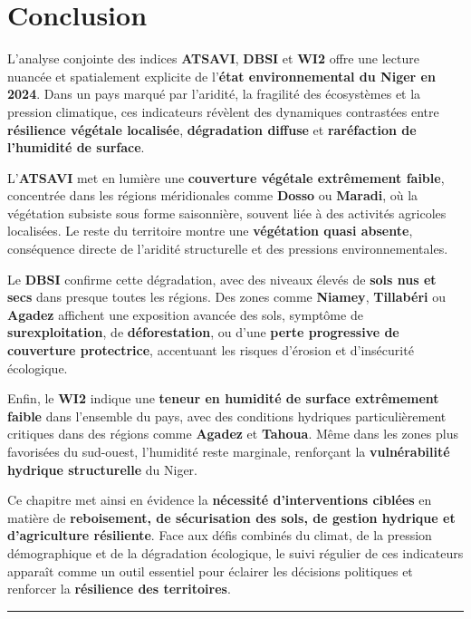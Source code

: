 \documentclass[
]{book}
\begin{document}
\section{Conclusion}\label{conclusion-3}

L'analyse conjointe des indices \textbf{ATSAVI}, \textbf{DBSI} et \textbf{WI2} offre une lecture nuancée et spatialement explicite de l'\textbf{état environnemental du Niger en 2024}. Dans un pays marqué par l'aridité, la fragilité des écosystèmes et la pression climatique, ces indicateurs révèlent des dynamiques contrastées entre \textbf{résilience végétale localisée}, \textbf{dégradation diffuse} et \textbf{raréfaction de l'humidité de surface}.

L'\textbf{ATSAVI} met en lumière une \textbf{couverture végétale extrêmement faible}, concentrée dans les régions méridionales comme \textbf{Dosso} ou \textbf{Maradi}, où la végétation subsiste sous forme saisonnière, souvent liée à des activités agricoles localisées. Le reste du territoire montre une \textbf{végétation quasi absente}, conséquence directe de l'aridité structurelle et des pressions environnementales.

Le \textbf{DBSI} confirme cette dégradation, avec des niveaux élevés de \textbf{sols nus et secs} dans presque toutes les régions. Des zones comme \textbf{Niamey}, \textbf{Tillabéri} ou \textbf{Agadez} affichent une exposition avancée des sols, symptôme de \textbf{surexploitation}, de \textbf{déforestation}, ou d'une \textbf{perte progressive de couverture protectrice}, accentuant les risques d'érosion et d'insécurité écologique.

Enfin, le \textbf{WI2} indique une \textbf{teneur en humidité de surface extrêmement faible} dans l'ensemble du pays, avec des conditions hydriques particulièrement critiques dans des régions comme \textbf{Agadez} et \textbf{Tahoua}. Même dans les zones plus favorisées du sud-ouest, l'humidité reste marginale, renforçant la \textbf{vulnérabilité hydrique structurelle} du Niger.

Ce chapitre met ainsi en évidence la \textbf{nécessité d'interventions ciblées} en matière de \textbf{reboisement, de sécurisation des sols, de gestion hydrique et d'agriculture résiliente}. Face aux défis combinés du climat, de la pression démographique et de la dégradation écologique, le suivi régulier de ces indicateurs apparaît comme un outil essentiel pour éclairer les décisions politiques et renforcer la \textbf{résilience des territoires}.

\begin{center}\rule{0.5\linewidth}{0.5pt}\end{center}
\end{document}
